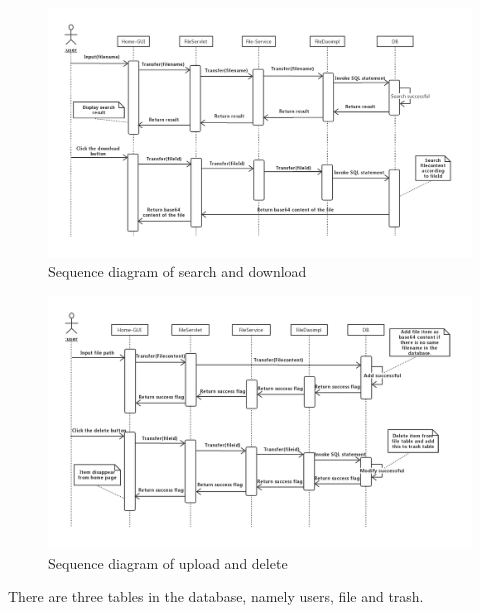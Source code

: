 \documentclass[a4paper,11pt]{article}
\begin{document}
\begin{figure}[ht]

\centering
\includegraphics[scale=0.37]{Sequence_diagram_search_and_download.png}
\caption{Sequence diagram of search and download}
\label{fig:Sequence diagram of search and download}
\end{figure}

\begin{figure}[ht]

\centering
\includegraphics[scale=0.38]{Sequence_diagram_upload_and_delete.png}
\caption{Sequence diagram of upload and delete}
\label{fig:Sequence diagram of upload and delete}
\end{figure}

\par There are three tables in the database, namely users, file and trash. 
\end{document}
